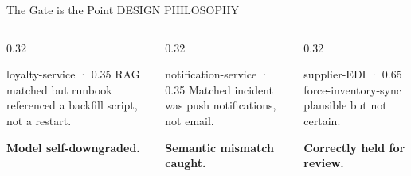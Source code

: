 \documentclass[aspectratio=169,10pt]{beamer}
\newcommand{\slidecat}[1]{{\color{cdim}\ttfamily\scriptsize\MakeUppercase{#1}}}
\begin{document}
\begin{frame}{The Gate is the Point}
  \slidecat{Design Philosophy}
  \vspace{0.2cm}
  \begin{columns}[T]
    \begin{column}{0.32\textwidth}
      \begin{block}{\color{camber}\ttfamily\tiny loyalty-service · 0.35}
        {\small RAG matched but runbook referenced a backfill script, not a restart.}
        \par{\color{camber}\small\bfseries Model self-downgraded.}
      \end{block}
    \end{column}
    \begin{column}{0.32\textwidth}
      \begin{block}{\color{camber}\ttfamily\tiny notification-service · 0.35}
        {\small Matched incident was push notifications, not email.}
        \par{\color{camber}\small\bfseries Semantic mismatch caught.}
      \end{block}
    \end{column}
    \begin{column}{0.32\textwidth}
      \begin{block}{\color{camber}\ttfamily\tiny supplier-EDI · 0.65}
        {\small force-inventory-sync plausible but not certain.}
        \par{\color{camber}\small\bfseries Correctly held for review.}
      \end{block}
    \end{column}
  \end{columns}


\end{frame}
\end{document}
